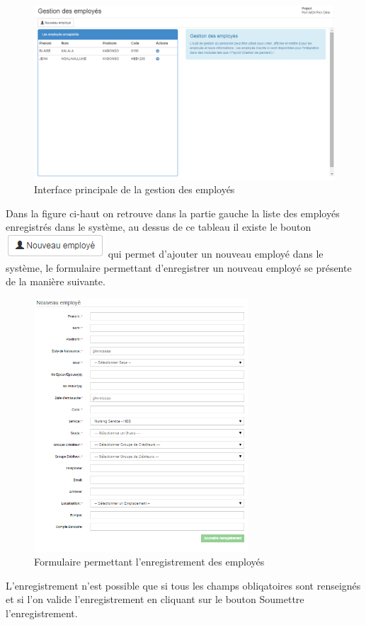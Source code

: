 \documentclass[12pt,a4paper]{report}
\begin{document}
\begin{figure}[h]
\begin{center}
\includegraphics[width=14cm]{pic/AdminEmp.png}
\end{center}
\caption{Interface principale de la gestion des employés}
\label{Interface principale de la gestion des employés}
\end{figure}

Dans la figure ci-haut on retrouve dans la partie gauche la liste des employés enregistrés dans le système, au dessus de ce tableau il existe le bouton \includegraphics[scale=1]{pic/New_emp.png} qui permet d'ajouter un nouveau employé dans le système, le formulaire permettant d'enregistrer un nouveau employé se présente de la manière suivante.

\begin{figure}[h]
\begin{center}
\includegraphics[width=8cm]{pic/FormNewEmp.png}
\end{center}
\caption{Formulaire permettant l'enregistrement des employés}
\label{Formulaire permettant l'enregistrement des employés}
\end{figure} 
\newpage
L'enregistrement n'est possible que si tous les champs obliqatoires sont renseignés et si l'on valide l'enregistrement en cliquant sur le bouton Soumettre l'enregistrement. 
\end{document}

